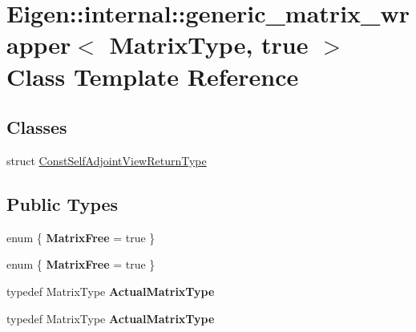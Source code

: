 \hypertarget{class_eigen_1_1internal_1_1generic__matrix__wrapper_3_01_matrix_type_00_01true_01_4}{}\section{Eigen\+:\+:internal\+:\+:generic\+\_\+matrix\+\_\+wrapper$<$ Matrix\+Type, true $>$ Class Template Reference}
\label{class_eigen_1_1internal_1_1generic__matrix__wrapper_3_01_matrix_type_00_01true_01_4}
\subsection*{Classes}
\begin{DoxyCompactItemize}
\item 
struct \hyperlink{struct_eigen_1_1internal_1_1generic__matrix__wrapper_3_01_matrix_type_00_01true_01_4_1_1_const_self_adjoint_view_return_type}{Const\+Self\+Adjoint\+View\+Return\+Type}
\end{DoxyCompactItemize}
\subsection*{Public Types}
\begin{DoxyCompactItemize}
\item 
\mbox{\label{class_eigen_1_1internal_1_1generic__matrix__wrapper_3_01_matrix_type_00_01true_01_4_a9b19dd1ff2c3bab0469cf1b401e97dae}} 
enum \{ {\bfseries Matrix\+Free} = true
 \}
\item 
\mbox{\label{class_eigen_1_1internal_1_1generic__matrix__wrapper_3_01_matrix_type_00_01true_01_4_a24cebb6a6eb01c1eb7138ad794a13c64}} 
enum \{ {\bfseries Matrix\+Free} = true
 \}
\item 
\mbox{\label{class_eigen_1_1internal_1_1generic__matrix__wrapper_3_01_matrix_type_00_01true_01_4_ad31c6c1566df071cba1c91589b586cc7}} 
typedef Matrix\+Type {\bfseries Actual\+Matrix\+Type}
\item 
\mbox{\label{class_eigen_1_1internal_1_1generic__matrix__wrapper_3_01_matrix_type_00_01true_01_4_ad31c6c1566df071cba1c91589b586cc7}} 
typedef Matrix\+Type {\bfseries Actual\+Matrix\+Type}
\end{DoxyCompactItemize}
